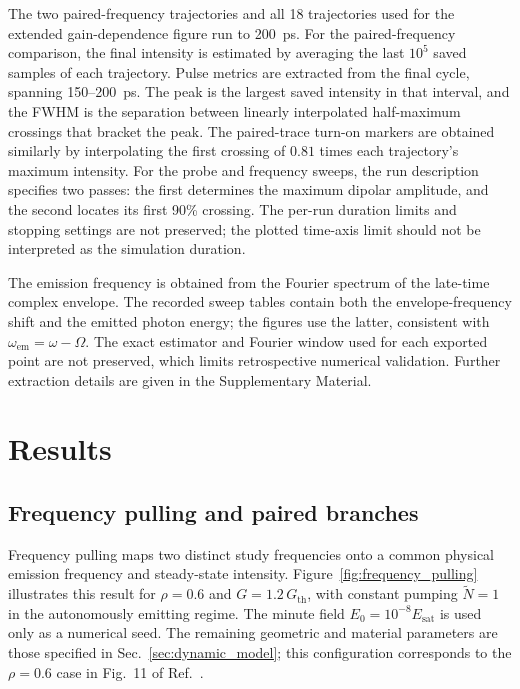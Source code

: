 \documentclass{optica-article}
\begin{document}
The two paired-frequency trajectories and all 18 trajectories used for the extended gain-dependence figure run to 200~ps. For the paired-frequency comparison, the final intensity is estimated by averaging the last $10^5$ saved samples of each trajectory. Pulse metrics are extracted from the final cycle, spanning 150--200~ps. The peak is the largest saved intensity in that interval, and the FWHM is the separation between linearly interpolated half-maximum crossings that bracket the peak. The paired-trace turn-on markers are obtained similarly by interpolating the first crossing of $0.81$ times each trajectory's maximum intensity. For the probe and frequency sweeps, the run description specifies two passes: the first determines the maximum dipolar amplitude, and the second locates its first 90\% crossing. The per-run duration limits and stopping settings are not preserved; the plotted time-axis limit should not be interpreted as the simulation duration.

The emission frequency is obtained from the Fourier spectrum of the late-time complex envelope. The recorded sweep tables contain both the envelope-frequency shift and the emitted photon energy; the figures use the latter, consistent with $\omega_{\mathrm{em}}=\omega-\Omega$. The exact estimator and Fourier window used for each exported point are not preserved, which limits retrospective numerical validation. Further extraction details are given in the Supplementary Material.

\section{Results}
\label{sec:results}

\subsection{Frequency pulling and paired branches}
\label{sec:frequency_pulling}


Frequency pulling maps two distinct study frequencies onto a common physical emission frequency and steady-state intensity. Figure~\ref{fig:frequency_pulling} illustrates this result for $\rho=0.6$ and $G=1.2\,G_{\mathrm{th}}$, with constant pumping $\widetilde N=1$ in the autonomously emitting regime. The minute field $E_0=10^{-8}E_{\mathrm{sat}}$ is used only as a numerical seed. The remaining geometric and material parameters are those specified in Sec.~\ref{sec:dynamic_model}; this configuration corresponds to the $\rho=0.6$ case in Fig.~11 of Ref.~\cite{Aradian:2024}.
\end{document}
